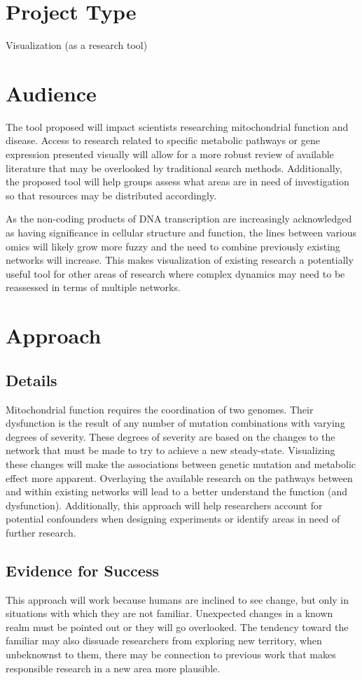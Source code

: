 \documentclass{proc}	%
\begin{document}
\section{Project Type}
Visualization (as a research tool)

\section{Audience} 
The tool proposed will impact scientists researching mitochondrial function and disease. Access to research related to specific metabolic pathways or gene expression presented visually will allow for a more robust review of available literature that may be overlooked by traditional search methods. Additionally, the proposed tool will help groups assess what areas are in need of investigation so that resources may be distributed accordingly.

As the non-coding products of DNA transcription are increasingly acknowledged as having significance in cellular structure and function, the lines between various omics will likely grow more fuzzy and the need to combine previously existing networks will increase. This makes visualization of existing research a potentially useful tool for other areas of research where complex dynamics may need to be reassessed in terms of multiple networks.
\section{Approach}
\subsection{Details}
Mitochondrial function requires the coordination of two genomes. Their dysfunction is the result of any number of mutation combinations with varying degrees of severity. These degrees of severity are based on the changes to the network that must be made to try to achieve a new steady-state. Visualizing these changes will make the associations between genetic mutation and metabolic effect more apparent. Overlaying the available research on the pathways between and within existing networks will lead to a better understand the function (and dysfunction). Additionally, this approach will help researchers account for potential confounders when designing experiments or identify areas in need of further research.
\subsection{Evidence for Success}
This approach will work because humans are inclined to see change, but only in situations with which they are not familiar. Unexpected changes in a known realm must be pointed out or they will go overlooked. The tendency toward the familiar may also dissuade researchers from exploring new territory, when unbeknownst to them, there may be connection to previous work that makes responsible research in a new area more plausible. 
\end{document}
